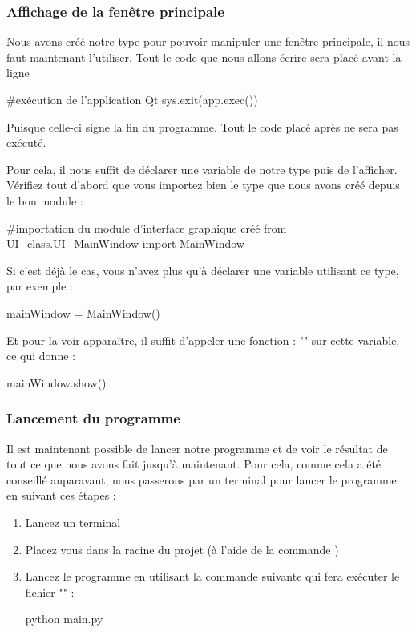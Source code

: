 \subsubsection{Affichage de la fenêtre principale}

Nous avons créé notre type  pour pouvoir manipuler une fenêtre principale, il nous faut maintenant l'utiliser.\newline
Tout le code que nous allons écrire sera placé avant la ligne
\begin{pyCode}
    #exécution de l'application Qt
	sys.exit(app.exec())
\end{pyCode}
Puisque celle-ci signe la fin du programme. Tout le code placé après ne sera pas exécuté.\smallSkip

Pour cela, il nous suffit de déclarer une variable de notre type  puis de l'afficher.\newline
Vérifiez tout d'abord que vous importez bien le type que nous avons créé depuis le bon module :
\begin{pyCode}
#importation du module d'interface graphique créé
from UI_class.UI_MainWindow import MainWindow
\end{pyCode}
Si c'est déjà le cas, vous n'avez plus qu'à déclarer une variable utilisant ce type, par exemple :
\begin{pyCode}
mainWindow = MainWindow()
\end{pyCode}
Et pour la voir apparaître, il suffit d'appeler une fonction : "" sur cette variable, ce qui donne :
\begin{pyCode}
mainWindow.show()
\end{pyCode}
\smallSkip


\subsubsection{Lancement du programme}
\label{tag-startProgFromCmdLine}
Il est maintenant possible de lancer notre programme et de voir le résultat de tout ce que nous avons fait jusqu'à maintenant.\newline
Pour cela, comme cela a été conseillé auparavant, nous passerons par un terminal pour lancer le programme en suivant ces étapes :
\begin{enumerate}
\item Lancez un terminal
    
\item Placez vous dans la racine du projet (à l'aide de la commande \textcolor{blue}{})
    
\item Lancez le programme en utilisant la commande suivante qui fera exécuter le fichier "" :
\begin{pyCode}
    python main.py
\end{pyCode}
\end{enumerate}

